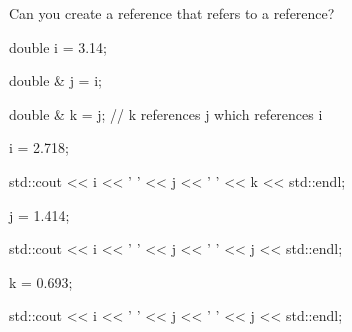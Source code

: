 Can you create a reference that refers to a reference?



\begin{consolethree}[escapeinside=||]

double i = 3.14;

double & j = i;

double & k = j; // k references j which references i



i = 2.718;

std::cout << i << ' ' << j << ' ' << k << std::endl;



j = 1.414;

std::cout << i << ' ' << j << ' ' << j << std::endl;



k = 0.693;

std::cout << i << ' ' << j << ' ' << j << std::endl;

\end{consolethree}

